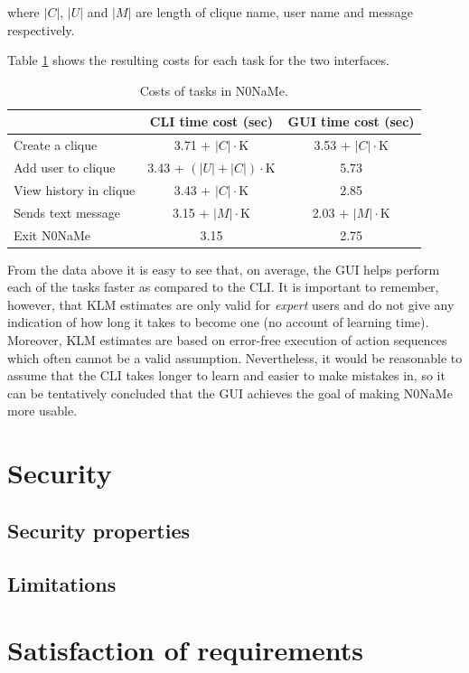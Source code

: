 \documentclass[a4paper, 12pt]{report}
\newcommand{\funkytt}{\fontfamily{AnonymousPro}\selectfont}
\begin{document}
where $|C|$, $|U|$ and $|M|$ are length of clique name, user name and message respectively.


Table \ref{tab:KLM_costs} shows the resulting costs for each task for the two interfaces.
\begin{table}[H]
\centering
\begin{tabular*}{0.9\linewidth}{l | c | c}
        & CLI time cost (sec) & GUI time cost (sec) \\
\hline
Create a clique & 3.71 + $|C|\cdot$K & 3.53 + $|C|\cdot$K\\
Add user to clique & 3.43 + $(|U| + |C|)\cdot$K & 5.73 \\
View history in clique & 3.43 + $|C|\cdot$K & 2.85 \\
Sends text message & 3.15 + $|M|\cdot$K & 2.03 + $|M|\cdot$K \\
Exit {\funkytt N0NaMe} & 3.15 & 2.75 \\
\end{tabular*}
\caption{\label{tab:KLM_costs} Costs of tasks in {\funkytt N0NaMe}.}
\end{table}
From the data above it is easy to see that, on average, the GUI helps perform each of the tasks faster as compared to the CLI. It is important to remember, however, that KLM estimates are only valid for \emph{expert} users and do not give any indication of how long it takes to become one (no account of learning time). Moreover, KLM estimates are based on error-free execution of action sequences which often cannot be a valid assumption. Nevertheless, it would be reasonable to assume that the CLI takes longer to learn and easier to make mistakes in, so it can be tentatively concluded that the GUI achieves the goal of making {\funkytt N0NaMe} more usable.

\section{Security}
\label{sec:eval.security}

\subsection{Security properties}


\subsection{Limitations}

\section{Satisfaction of requirements}
\label{sec:eval.req}
\end{document}
